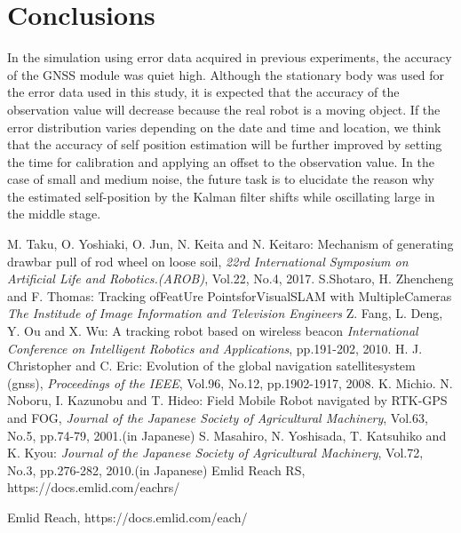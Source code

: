 \documentclass[a4paper]{article}
\begin{document}
\section{Conclusions}

In the simulation using error data acquired in previous experiments, 
the accuracy of the GNSS module was quiet high. Although the stationary body 
was used for the error data used in this study, it is expected that the accuracy 
of the observation value will decrease because the real robot is a moving object. 
If the error distribution varies depending on the date and time and location, 
we think that the accuracy of self position estimation will be further improved 
by setting the time for calibration and applying an offset to the observation value. 
In the case of small and medium noise, the future task is to elucidate the reason 
why the estimated self-position by the Kalman filter shifts while oscillating large 
in the middle stage.

\begin{thebibliography}{99}
M. Taku, O. Yoshiaki, O. Jun, N. Keita and N. Keitaro:
Mechanism of generating drawbar pull of rod wheel on loose soil,
{\it 22rd International Symposium on Artificial Life and Robotics.(AROB)}, Vol.22, No.4, 2017.
S.Shotaro, H. Zhencheng and F. Thomas:
Tracking ofFeatUre PointsforVisualSLAM with MultipleCameras
{\it The Institude of Image Information and Television Engineers}
Z. Fang, L. Deng, Y. Ou and X. Wu:
A tracking robot based on wireless beacon
{\it International Conference on Intelligent Robotics and Applications}, pp.191-202, 2010.
H. J. Christopher and C. Eric:
Evolution of the global navigation satellitesystem (gnss),
{\it Proceedings of the IEEE}, Vol.96, No.12, pp.1902-1917, 2008.
K. Michio. N. Noboru, I. Kazunobu and T. Hideo: 
Field Mobile Robot navigated by RTK-GPS and FOG, 
{\it Journal of the Japanese Society of Agricultural Machinery}, Vol.63, No.5, pp.74-79, 2001.(in Japanese)
S. Masahiro, N. Yoshisada, T. Katsuhiko and K. Kyou: 
{\it Journal of the Japanese Society of Agricultural Machinery}, Vol.72, No.3, pp.276-282, 2010.(in Japanese)
Emlid Reach RS, https://docs.emlid.com/eachrs/

Emlid Reach, https://docs.emlid.com/each/
\end{thebibliography}
\end{document}
